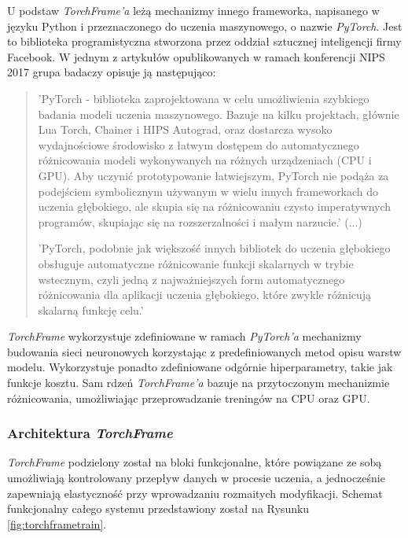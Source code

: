     U podstaw \textit{TorchFrame'a} leżą mechanizmy innego frameworka, napisanego w języku Python i
    przeznaczonego do uczenia maszynowego, o nazwie \textit{PyTorch}. Jest to
    biblioteka programistyczna stworzona przez oddział sztucznej inteligencji firmy
    Facebook. W jednym z artykułów \cite{pytorch} opublikowanych w ramach konferencji NIPS 2017
    grupa badaczy opisuje ją następująco:

    \begin{quote}
      'PyTorch - biblioteka zaprojektowana w celu umożliwienia szybkiego badania
      modeli uczenia maszynowego. Bazuje na kilku projektach, głównie Lua Torch,
      Chainer i HIPS Autograd, oraz dostarcza wysoko wydajnościowe środowisko z
      łatwym dostępem do automatycznego różnicowania modeli wykonywanych na różnych
      urządzeniach (CPU i GPU). Aby uczynić prototypowanie łatwiejszym, PyTorch
      nie podąża za podejściem symbolicznym używanym w wielu innych frameworkach
      do uczenia głębokiego, ale skupia się na różnicowaniu czysto imperatywnych
      programów, skupiając się na rozszerzalności i małym narzucie.' (...)

      'PyTorch, podobnie jak większość innych bibliotek do uczenia głębokiego obsługuje
      automatyczne różnicowanie funkcji skalarnych w trybie wstecznym, czyli jedną z najważniejszych form
      automatycznego różnicowania dla aplikacji uczenia głębokiego, które zwykle
      różnicują skalarną funkcję celu.'
    \end{quote}

    \textit{TorchFrame} wykorzystuje zdefiniowane w ramach \textit{PyTorch'a} mechanizmy budowania sieci neuronowych
    korzystając z predefiniowanych metod opisu warstw modelu. Wykorzystuje ponadto
    zdefiniowane odgórnie hiperparametry, takie jak funkcje kosztu. Sam rdzeń \textit{TorchFrame'a}
    bazuje na przytoczonym mechanizmie różnicowania, umożliwiając przeprowadzanie treningów
    na CPU oraz GPU.

  \subsubsection{Architektura \textit{TorchFrame}}

    \textit{TorchFrame} podzielony został na bloki funkcjonalne, które powiązane ze sobą
    umożliwiają kontrolowany przepływ danych w procesie uczenia, a jednocześnie
    zapewniają elastyczność przy wprowadzaniu rozmaitych modyfikacji. Schemat funkcjonalny
    całego systemu przedstawiony został na Rysunku \ref{fig:torchframetrain}.

